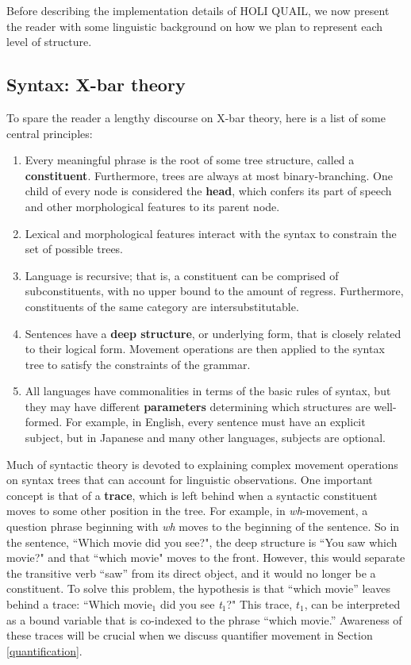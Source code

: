 \documentclass[11pt, oneside]{article}      %
\begin{document}
Before describing the implementation details of HOLI QUAIL, we now present the reader with some linguistic background on how we plan to represent each level of structure.

\subsection{Syntax: X-bar theory}

To spare the reader a lengthy discourse on X-bar theory, here is a list of some central principles:

\begin{enumerate}
\item Every meaningful phrase is the root of some tree structure, called a \textbf{constituent}.  Furthermore, trees are always at most binary-branching.  One child of every node is considered the \textbf{head}, which confers its part of speech and other morphological features to its parent node.
\item Lexical and morphological features interact with the syntax to constrain the set of possible trees.
\item Language is recursive; that is, a constituent can be comprised of subconstituents, with no upper bound to the amount of regress.  Furthermore, constituents of the same category are intersubstitutable.  
\item Sentences have a \textbf{deep structure}, or underlying form, that is closely related to their logical form.  Movement operations are then applied to the syntax tree to satisfy the constraints of the grammar.
\item All languages have commonalities in terms of the basic rules of syntax, but they may have different \textbf{parameters} determining which structures are well-formed.  For example, in English, every sentence must have an explicit subject, but in Japanese and many other languages, subjects are optional.
\end{enumerate}

Much of syntactic theory is devoted to explaining complex movement operations on syntax trees that can account for linguistic observations.  One important concept is that of a \textbf{trace}, which is left behind when a syntactic constituent moves to some other position in the tree.  For example, in \textit{wh}-movement, a question phrase beginning with \textit{wh} moves to the beginning of the sentence.  So in the sentence, ``Which movie did you see?", the deep structure is ``You saw which movie?" and that ``which movie" moves to the front.  However, this would separate the transitive verb ``saw'' from its direct object, and it would no longer be a constituent.  To solve this problem, the hypothesis is that ``which movie'' leaves behind a trace: ``Which movie$_1$ did you see \textit{t}$_1$?"  This trace, $t_1$, can be interpreted as a bound variable that is co-indexed to the phrase ``which movie.''  Awareness of these traces will be crucial when we discuss quantifier movement in Section \ref{quantification}.
\end{document}

